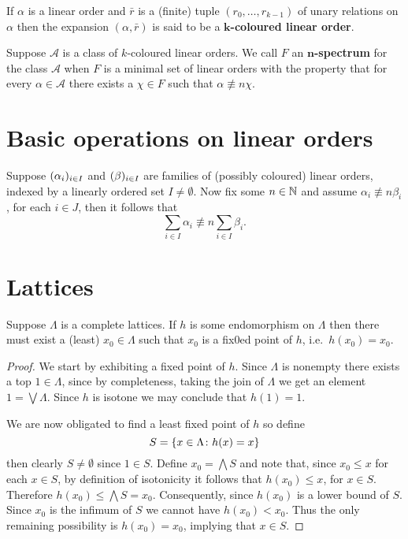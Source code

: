 \begin{dfn}
	If $\alpha$ is a linear order and $\bar{r}$ is a (finite) tuple $(r_0,\dotsc,r_{k-1})$ of unary relations on $\alpha$ then the expansion $(\alpha,\bar{r})$ is said to be a $\mathbf{k}$\textbf{-coloured linear order}.
\end{dfn}

\begin{dfn}[Spectrum]
	Suppose $\mathcal{A}$ is a class of $k$-coloured linear orders.  We call $F$ an $\mathbf{n}$\textbf{-spectrum} for the class $\mathcal{A}$ when $F$ is a minimal set of linear orders with the property that for every $\alpha\in\mathcal{A}$ there exists a $\chi\in F$ such that $\alpha\nequiv{n}\chi$.
\end{dfn}


\section{Basic operations on linear orders}

\begin{lem}\label{lem:fvsum}
	Suppose $(\alpha_i)_{i\in I}$ and $(\beta)_{i\in I}$ are families of (possibly coloured) linear orders, indexed by a linearly ordered set $I\neq\emptyset$.  Now fix some $n\in\mathbb{N}$ and assume $\alpha_i\nequiv{n}\beta_i$, for each $i\in J$, then it follows that
	\begin{equation}
		\sum_{i\in I}\alpha_i\nequiv{n}\sum_{i\in I}\beta_i.
	\end{equation}
\end{lem}


\section{Lattices}

\begin{thm}
	Suppose $\Lambda$ is a complete lattices.  If $h$ is some endomorphism on $\Lambda$ then there must exist a (least) $x_0\in \Lambda$ such that $x_0$ is a fix0ed point of $h$, i.e.\ $h(x_0)=x_0$.
\end{thm}
\begin{proof}
	We start by exhibiting a fixed point of $h$.  Since $\Lambda$ is nonempty there exists a top $1\in\Lambda$, since by completeness, taking the join of $\Lambda$ we get an element $1=\bigvee\Lambda$.  Since $h$ is isotone we may conclude that $h(1)=1$.

	We are now obligated to find a least fixed point of $h$ so define
	\begin{equation}
		S=\lbrace x\in\Lambda\colon h(x)=x \rbrace
	\end{equation}  then clearly $S\neq\emptyset$ since $1\in S$.  Define $x_0=\bigwedge S$ and note that, since $x_0\leq x$ for each $x\in S$, by definition of isotonicity it follows that $h(x_0)\leq x$, for $x\in S$. Therefore $h(x_0)\leq\bigwedge S=x_0$.  Consequently, since $h(x_0)$ is a lower bound of $S$.  Since $x_0$ is the infimum of $S$ we cannot have $h(x_0)<x_0$.  Thus the only remaining possibility is $h(x_0)=x_0$, implying that $x\in S$.
\end{proof}


